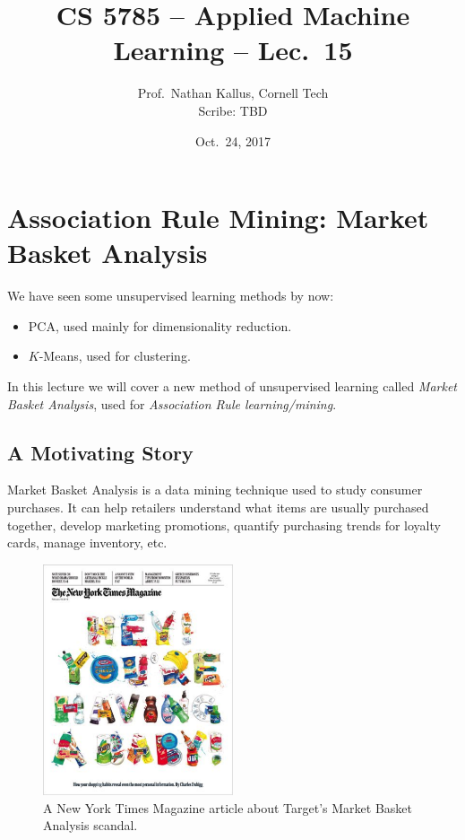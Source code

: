 \documentclass[a4paper]{article}
\title{CS 5785 -- Applied Machine Learning -- Lec.\ 15}
\author{Prof.\ Nathan Kallus, Cornell Tech\\Scribe: TBD}
\date{Oct.\ 24, 2017 }
\begin{document}
\maketitle

\section{Association Rule Mining: Market Basket Analysis}

We have seen some unsupervised learning methods by now:
\begin{itemize}
\item PCA, used mainly for dimensionality reduction.
\item $K$-Means, used for clustering.
\end{itemize}
In this lecture we will cover a new method of unsupervised learning called  \textit{Market Basket Analysis}, used for \textit{Association Rule learning/mining}.

\subsection{A Motivating Story}

Market Basket Analysis is a data mining technique used to study consumer purchases. It can help retailers understand what items are usually purchased together, develop marketing promotions, quantify purchasing trends for loyalty cards, manage inventory, etc.
\begin{figure}
\centering
\includegraphics[width=0.5\textwidth]{TargetMarketBasket.png}
\caption{\label{fig:target} A New York Times Magazine article about Target's Market Basket Analysis scandal.}
\end{figure}
\end{document}
